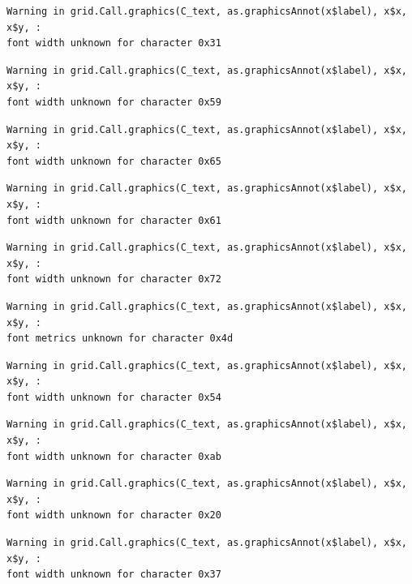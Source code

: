 \documentclass[
  letterpaper,
]{scrbook}
\begin{document}
\begin{verbatim}
Warning in grid.Call.graphics(C_text, as.graphicsAnnot(x$label), x$x, x$y, :
font width unknown for character 0x31
\end{verbatim}

\begin{verbatim}
Warning in grid.Call.graphics(C_text, as.graphicsAnnot(x$label), x$x, x$y, :
font width unknown for character 0x59
\end{verbatim}

\begin{verbatim}
Warning in grid.Call.graphics(C_text, as.graphicsAnnot(x$label), x$x, x$y, :
font width unknown for character 0x65
\end{verbatim}

\begin{verbatim}
Warning in grid.Call.graphics(C_text, as.graphicsAnnot(x$label), x$x, x$y, :
font width unknown for character 0x61
\end{verbatim}

\begin{verbatim}
Warning in grid.Call.graphics(C_text, as.graphicsAnnot(x$label), x$x, x$y, :
font width unknown for character 0x72
\end{verbatim}

\begin{verbatim}
Warning in grid.Call.graphics(C_text, as.graphicsAnnot(x$label), x$x, x$y, :
font metrics unknown for character 0x4d
\end{verbatim}

\begin{verbatim}
Warning in grid.Call.graphics(C_text, as.graphicsAnnot(x$label), x$x, x$y, :
font width unknown for character 0x54
\end{verbatim}

\begin{verbatim}
Warning in grid.Call.graphics(C_text, as.graphicsAnnot(x$label), x$x, x$y, :
font width unknown for character 0xab
\end{verbatim}

\begin{verbatim}
Warning in grid.Call.graphics(C_text, as.graphicsAnnot(x$label), x$x, x$y, :
font width unknown for character 0x20
\end{verbatim}

\begin{verbatim}
Warning in grid.Call.graphics(C_text, as.graphicsAnnot(x$label), x$x, x$y, :
font width unknown for character 0x37
\end{verbatim}
\end{document}
